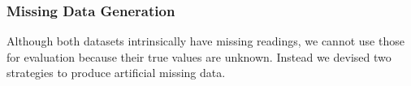 





\subsubsection{Missing Data Generation}


Although both datasets intrinsically have missing readings, we cannot use those for evaluation because their true values are unknown.
Instead we devised two strategies to produce artificial missing data.
